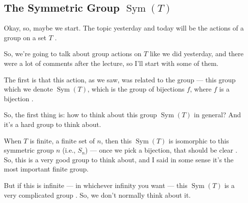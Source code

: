 \subsection{The Symmetric Group \texorpdfstring{$\operatorname{Sym}(T)$}{Sym(T)}}

\begin{speech}[00:00:00 - 00:00:46]
Okay, so, maybe we start. The topic yesterday and today will be the actions of a group on a set $T$ .

So, we're going to talk about group actions on $T$ like we did yesterday, and there were a lot of comments after the lecture, so I'll start with some of them.

The first is that this action, as we saw, was related to the group --- this group which we denote $\operatorname{Sym}(T)$, which is the group of bijections $f$, where $f$ is a bijection .
\end{speech}

\begin{content}
\end{content}

\begin{speech}[00:00:46 - 00:01:23]
So, the first thing is: how to think about this group $\operatorname{Sym}(T)$ in general? And it's a hard group to think about.

When $T$ is finite, a finite set of $n$, then this $\operatorname{Sym}(T)$ is isomorphic to this symmetric group $n$ (i.e., $S_n$) --- once we pick a bijection, that should be clear . So, this is a very good group to think about, and I said in some sense it's the most important finite group.

But if this is infinite --- in whichever infinity you want --- this $\operatorname{Sym}(T)$ is a very complicated group . So, we don't normally think about it.
\end{speech}

